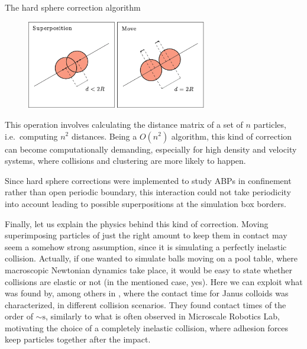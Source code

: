 \documentclass[../../master_thesis_np.tex]{subfiles}
\begin{document}
	\begin{algorithm}[htp]
		\caption{The hard sphere correction algorithm} \label{alg:hardsphere}	
		\begin{algorithmic}[1]
			 

			\EndIf
			\EndFor
		\end{algorithmic}
		\end{algorithm}

		\begin{figure}[htp]
			\centering
			\includegraphics[width = 0.7\textwidth]{callegari_volpe_2019_hardsphere.png}
			\label{fig:hardsphere}
			\caption{ \cite{callegari_numerical_2019}}
		\end{figure}

	This operation involves calculating the distance matrix of a set of $n$ particles, i.e.~computing $n^2$ distances. Being a $O(n^2)$ algorithm, this kind of correction can become computationally demanding, especially for high density and velocity systems, where collisions and clustering are more likely to happen.
	
	Since hard sphere corrections were implemented to study ABPs in confinement rather than open periodic boundary, this interaction could not take periodicity into account leading to possible superpositions at the simulation box borders.
	
	Finally, let us explain the physics behind this kind of correction. Moving superimposing particles of just the right amount to keep them in contact may seem a somehow strong assumption, since it is simulating a perfectly inelastic collision. Actually, if one wanted to simulate balls moving on a pool table, where macroscopic Newtonian dynamics take place, it would be easy to state whether collisions are elastic or not (in the mentioned case, yes). Here we can exploit what was found by, among others \citeauthor{singh_pair_2024} in \cite{singh_pair_2024}, where the contact time for Janus colloids was characterized, in different collision scenarios. They found contact times of the order of $\sim \text{s}$, similarly to what is often observed in Microscale Robotics Lab, motivating the choice of a completely inelastic collision, where adhesion forces keep particles together after the impact. 
\end{document}
